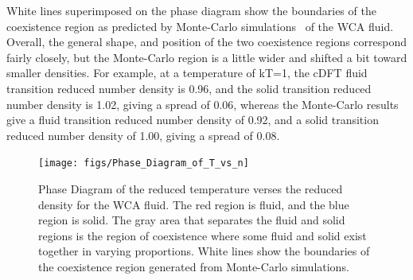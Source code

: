 \documentclass[double,12pt]{beavtex}
\begin{document}
White lines superimposed on the phase diagram show the boundaries of the 
coexistence region as predicted by Monte-Carlo simulations~\cite{May} 
of the WCA fluid. 
Overall, the general shape, and position of the two coexistence regions 
correspond fairly closely, but the Monte-Carlo region is a little wider
and shifted a bit toward smaller densities. For example, at a temperature 
of kT=1, the cDFT fluid transition reduced number density is 0.96, 
and the solid transition reduced number density is 1.02, giving a spread 
of 0.06, whereas the Monte-Carlo results give a fluid transition 
reduced number density of 0.92, and a solid transition reduced number 
density of 1.00, giving a spread of 0.08. 

\begin{figure}
  \centering
  \texttt{[image: figs/Phase\_Diagram\_of\_T\_vs\_n]}
  \caption{Phase Diagram of the reduced temperature verses the reduced 
  density for the WCA fluid. The red region is fluid, and the blue region is 
  solid. The gray area that separates the fluid and solid regions 
  is the region of coexistence where some fluid and solid exist together 
  in varying proportions. White lines show the boundaries of the coexistence 
  region generated from Monte-Carlo simulations.}
  \label{fig:Phase_Diagram_of_T_vs_n}
\end{figure}

%
%
%
\end{document}

